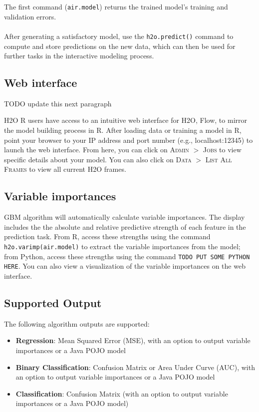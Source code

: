 \noindent
The first command ({\texttt{air.model}}) returns the trained model's training and validation errors.
\\
\\
After generating a satisfactory model, use the \texttt{h2o.predict()} command to compute and store predictions on the
new data, which can then be used for further tasks in the interactive modeling process.

\waterExampleInR


\waterExampleInPython



\subsection{Web interface}

TODO update this next paragraph

H2O R users have access to an intuitive web interface for H2O, Flow, to mirror the model building process in R. After
loading data or training a model in R, point your browser to your IP address and port number (e.g., localhost:12345)
to launch the web interface. From here, you can click on \textsc{Admin} $>$ \textsc{Jobs} to view specific details
about your model. You can also click on \textsc{Data} $>$ \textsc{List All Frames} to view all current H2O frames.

\subsection{Variable importances}

GBM algorithm will automatically calculate variable importances. The display includes the
the absolute and relative predictive strength of each feature in the prediction task. From R, access these strengths
using the command \texttt{h2o.varimp(air.model)} to extract the variable importances from the model;
from Python, access these strengths using the command
\texttt{TODO PUT SOME PYTHON HERE}.  You can also view a visualization of the variable
importances on the web interface.

\subsection{Supported Output}

The following algorithm outputs are supported:
\begin{itemize}
\item {\bf{Regression}}: Mean Squared Error (MSE), with an option to output variable importances or a Java POJO model
\item {\bf{Binary Classification}}: Confusion Matrix or Area Under Curve (AUC), with an option to output variable
importances or a Java POJO model
\item {\bf{Classification}}: Confusion Matrix (with an option to output variable importances or a Java POJO model)
\end{itemize}

